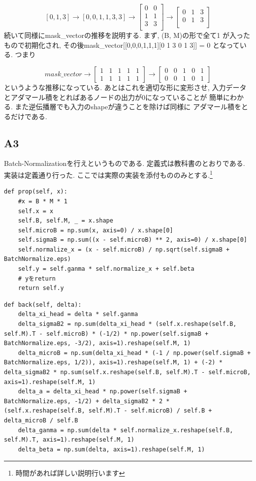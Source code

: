 \documentclass[a4paper,11pt]{jsarticle}
\begin{document}
$$
  [0, 1, 3] \rightarrow [0, 0, 1, 1, 3, 3] \rightarrow
  \begin{bmatrix}
    0 & 0 \\
    1 & 1 \\
    3 & 3 \\
  \end{bmatrix}
  \rightarrow \begin{bmatrix}
    0 & 1 & 3 \\
    0 & 1 & 3 \\
  \end{bmatrix}
$$
続いて同様にmask\_vectorの推移を説明する. まず, (B, M)の形で全て1
が入ったもので初期化され, その後mask\_vector[[0,0,0,1,1,1][0 1 3 0 1 3]] = 0
となっている. つまり

$$
  mask\_vector \rightarrow \begin{bmatrix}
    1 & 1 & 1 & 1 & 1 \\
    1 & 1 & 1 & 1 & 1
  \end{bmatrix} \rightarrow
  \begin{bmatrix}
    0 & 0 & 1 & 0 & 1 \\
    0 & 0 & 1 & 0 & 1
  \end{bmatrix}
$$
というような推移になっている. あとはこれを適切な形に変形させ,
入力データとアダマール積をとればあるノードの出力が0になっていることが
簡単にわかる. また逆伝播層でも入力のshapeが違うことを除けば同様に
アダマール積をとるだけである.
\subsection{A3}
Batch-Normalizationを行えというものである.
定義式は教科書のとおりである. 実装は定義通り行った.
ここでは実際の実装を添付もののみとする.\footnote{時間があれば詳しい説明行います}
\begin{lstlisting}[caption=Batch-Normalization-prop]
  def prop(self, x):
    #x = B * M * 1
    self.x = x
    self.B, self.M, _ = x.shape
    self.microB = np.sum(x, axis=0) / x.shape[0]
    self.sigmaB = np.sum((x - self.microB) ** 2, axis=0) / x.shape[0]
    self.normalize_x = (x - self.microB) / np.sqrt(self.sigmaB + BatchNormalize.eps)
    self.y = self.ganma * self.normalize_x + self.beta
    # yをreturn
    return self.y
\end{lstlisting}

\begin{lstlisting}[caption=Batch-Normalization-back]
  def back(self, delta):
    delta_xi_head = delta * self.ganma
    delta_sigmaB2 = np.sum(delta_xi_head * (self.x.reshape(self.B, self.M).T - self.microB) * (-1/2) * np.power(self.sigmaB + BatchNormalize.eps, -3/2), axis=1).reshape(self.M, 1)
    delta_microB = np.sum(delta_xi_head * (-1 / np.power(self.sigmaB + BatchNormalize.eps, 1/2)), axis=1).reshape(self.M, 1) + (-2) * delta_sigmaB2 * np.sum(self.x.reshape(self.B, self.M).T - self.microB, axis=1).reshape(self.M, 1)
    delta_a = delta_xi_head * np.power(self.sigmaB + BatchNormalize.eps, -1/2) + delta_sigmaB2 * 2 * (self.x.reshape(self.B, self.M).T - self.microB) / self.B + delta_microB / self.B
    delta_ganma = np.sum(delta * self.normalize_x.reshape(self.B, self.M).T, axis=1).reshape(self.M, 1)
    delta_beta = np.sum(delta, axis=1).reshape(self.M, 1)
\end{lstlisting}
\end{document}
